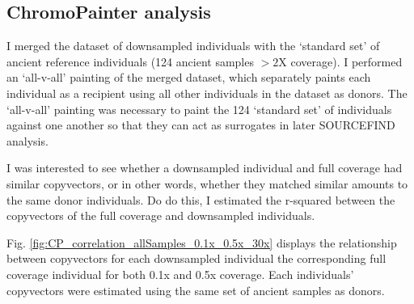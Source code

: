 \subsection{ChromoPainter analysis}

I merged the dataset of downsampled individuals with the `standard set' of ancient reference individuals (124 ancient samples $>2$X coverage). I performed an `all-v-all' painting of the merged dataset, which separately paints each individual as a recipient using all other individuals in the dataset as donors. The `all-v-all' painting was necessary to paint the 124 `standard set' of individuals against one another so that they can act as surrogates in later SOURCEFIND analysis. 

I was interested to see whether a downsampled individual and full coverage had similar copyvectors, or in other words, whether they matched similar amounts to the same donor individuals. Do do this, I estimated the r-squared between the copyvectors of the full coverage and downsampled individuals.

Fig. \ref{fig:CP_correlation_allSamples_0.1x_0.5x_30x} displays the relationship between copyvectors for each downsampled individual the corresponding full coverage individual for both 0.1x and 0.5x coverage. Each individuals' copyvectors were estimated using the same set of ancient samples as donors.

